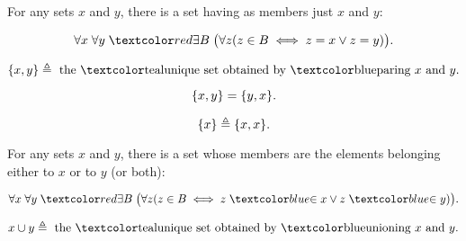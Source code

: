 
\begin{frame}{}
  \begin{axiom}
    For any sets $x$ and $y$, there is a set having as members just $x$ and $y$:

    \[
      \forall x\; \forall y\; \red{\exists B}\; \big(\forall z (z \in B \iff z = x \lor z = y)\big).
    \]
  \end{axiom}

  \pause
  \begin{definition}[``$\set{x, y}$'']
    \[
      \set{x, y} \triangleq \text{ the \teal{unique} set obtained by \blue{paring} } x \text{ and } y.
    \]
  \end{definition}

  \pause
  \begin{theorem}
    \[
      \{x, y\} = \{y, x\}.
    \]
  \end{theorem}

  \pause
  \begin{definition}[``$\set{x}$'']
    \[
      \{x\} \triangleq \{x, x\}.
    \]
  \end{definition}
\end{frame}

\begin{frame}{}
  \begin{axiom}
    For any sets $x$ and $y$, there is a set whose members are
    the elements belonging either to $x$ or to $y$ (or both):

    \[
      \forall x\; \forall y\; \red{\exists B}\; \big(\forall z (z \in B \iff z \;\blue{\in}\; x \lor z \;\blue{\in}\; y)\big).
    \]
  \end{axiom}

  \pause
  \vspace{0.60cm}
  \begin{definition}[``$x \cup y$'']
    \[
      x \cup y \triangleq \text{ the \teal{unique} set obtained by \blue{unioning} } x \text{ and } y.
    \]
  \end{definition}
\end{frame}

